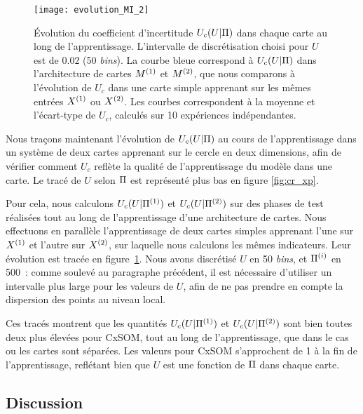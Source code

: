 \documentclass[../main]{subfiles}
\begin{document}
\begin{figure}
    \centering\texttt{[image: evolution\_MI\_2]}
    \caption{\'Evolution du coefficient d'incertitude $U_c(U|\Pi)$ dans chaque carte au long de l'apprentissage. L'intervalle de discrétisation choisi pour $U$ est de $0.02$ (50 \emph{bins}).
    La courbe bleue correspond à $U_c(U|\Pi)$ dans l'architecture de cartes $M^{({1})}$ et $M^{({2})}$, que nous comparons à l'évolution de $U_c$ dans une carte simple apprenant sur les mêmes entrées $X^{({1})}$ ou $X^{({2})}$. Les courbes correspondent à la moyenne et l'écart-type de $U_c$, calculés sur 10 expériences indépendantes.}
    \label{fig:MI_evol}
    \end{figure}

Nous traçons maintenant l'évolution de $U_c(U|\Pi)$ au cours de l'apprentissage dans un système de deux cartes apprenant sur le cercle en deux dimensions, afin de vérifier comment $U_c$ reflète la qualité de l'apprentissage du modèle dans une carte. 
Le tracé de $U$ selon $\Pi$ est représenté plus bas en figure \ref{fig:cr_xp}.

Pour cela, nous calculons $U_c(U|\Pi^{({1})})$ et $U_c(U|\Pi^{({2})})$ sur des phases de test réalisées tout au long de l'apprentissage d'une architecture de cartes. Nous effectuons en parallèle l'apprentissage de deux cartes simples apprenant l'une sur $X^{({1})}$ et l'autre sur $X^{({2})}$, sur laquelle nous calculons les mêmes indicateurs.
Leur évolution est tracée en figure~\ref{fig:MI_evol}.
Nous avons discrétisé $U$ en 50 \emph{bins}, et  $\Pi^{({i})}$ en 500~: comme soulevé au paragraphe précédent, il est nécessaire d'utiliser un intervalle plus large pour les valeurs de $U$, afin de ne pas prendre en compte la dispersion des points au niveau local.

Ces tracés montrent que les quantités $U_c(U|\Pi^{({1})})$ et $U_c(U|\Pi^{({2})})$ sont bien toutes deux plus élevées pour CxSOM, tout au long de l'apprentissage, que dans le cas ou les cartes sont séparées. Les valeurs pour CxSOM s'approchent de 1 à la fin de l'apprentissage, reflétant bien que $U$ est une fonction de $\Pi$ dans chaque carte.

\subsection{Discussion}
\end{document}
